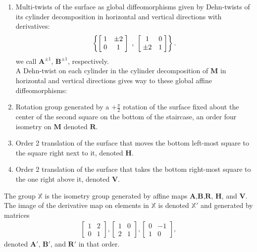 \documentclass[]{article}
\begin{document}
\begin{enumerate}[label=(\roman*)]
\item Multi-twists of the surface as global diffeomorphisms given by Dehn-twists of its cylinder decomposition in horizontal and vertical directions with derivatives:
\begin{equation*}
\left\{ \left[ \hspace{1mm} \begin{matrix}
				1 &  \pm 2\\
				0 & 1
			\end{matrix}\hspace{1mm}\right] \text{ , }
			\left[ \hspace{1mm} \begin{matrix}
							1 & 0\\
							 \pm 2 & 1
						\end{matrix}\hspace{1mm}\right] \right\}.
\end{equation*}
we call $\mathbf{A}^{\pm 1}$, $\mathbf{B}^{\pm 1}$, respectively.\\
A Dehn-twist on each cylinder in the cylinder decomposition of $\mathbf{M}$ in horizontal and vertical directions gives way to these global affine diffeomorphisms:
\begin{figure}[H]
\centering

\label{fig:skew}
\end{figure}

\item Rotation group generated by a $+\frac{\pi}{2}$ rotation of the surface fixed about the center of the second square on the bottom of the staircase, an order four isometry on $\mathbf{M}$ denoted $\mathbf{R}$.

\item  Order 2 translation of the surface that moves the bottom left-most square to the square right next to it, denoted $\mathbf{H}$.
\item Order 2 translation of the surface that takes the bottom right-most square to the one right above it, denoted $\mathbf{V}$.
\end{enumerate}

\begin{Def}
The group $\mathbb{X}$ is the isometry group generated by affine maps $\mathbf{A}$,$\mathbf{B}$,$\mathbf{R}$, $\mathbf{H}$, and $\mathbf{V}$. The image of the derivative map on elements in $\mathbb{X}$ is denoted $\mathbb{X}'$ and generated by matrices
\begin{align*}
\left[\begin{matrix}
1 & 2 \\ 0 & 1
\end{matrix}\right],
\left[\begin{matrix}
1 & 0 \\ 2 & 1
\end{matrix}\right],
\left[\begin{matrix}
0 & -1 \\ 1 & 0
\end{matrix}\right],
\end{align*}
denoted $\mathbf{A}'$, $\mathbf{B}'$, and $\mathbf{R}'$ in that order.
\end{Def}
\end{document}
